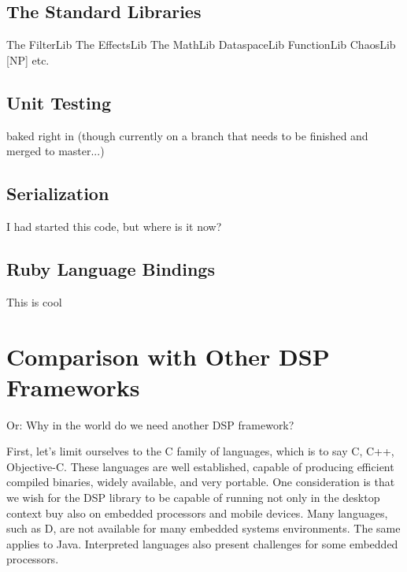 \documentclass[twoside,10pt]{article}
\begin{document}
\subsection{The Standard Libraries}

The FilterLib
The EffectsLib
The MathLib
DataspaceLib
FunctionLib 
ChaosLib [NP]
etc.

\subsection{Unit Testing}

baked right in (though currently on a branch that needs to be finished and merged to master...)


\subsection{Serialization}

I had started this code, but where is it now?


\subsection{Ruby Language Bindings}

This is cool




\section{Comparison with Other DSP Frameworks} %

Or: Why in the world do we need another DSP framework?

%

First, let's limit ourselves to the C family of languages, which is to say C, C++, Objective-C.  These languages are well established, capable of producing efficient compiled binaries, widely available, and very portable.  One consideration is that we wish for the DSP library to be capable of running not only in the desktop context buy also on embedded processors and mobile devices.  Many languages, such as D, are not available for many embedded systems environments.  The same applies to Java.  Interpreted languages also present challenges for some embedded processors.
\end{document}
